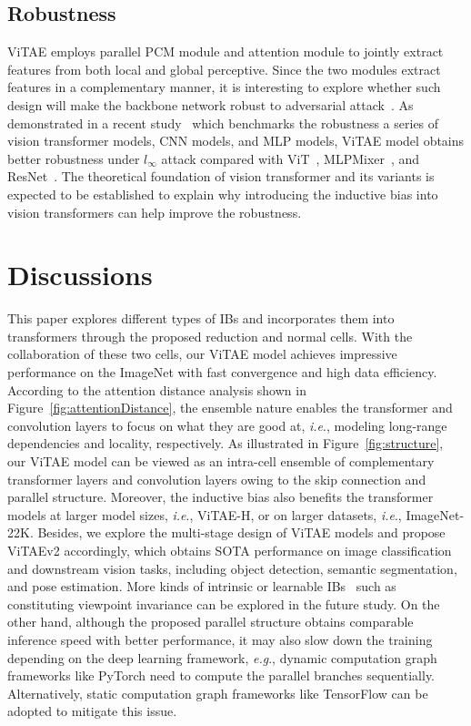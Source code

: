 \documentclass[twocolumn]{svjour3}          \smartqed  \usepackage{natbib}
\newcommand{\ie}{i.e}
\newcommand{\eg}{e.g}
\def\onedot{.\xspace}
\def\eg{\emph{e.g}\onedot}
\def\ie{\emph{i.e}\onedot}
\begin{document}
\subsection{Robustness} 
ViTAE employs parallel PCM module and attention module to jointly extract features from both local and global perceptive. Since the two modules extract features in a complementary manner, it is interesting to explore whether such design will make the backbone network robust to adversarial attack~\citep{bhojanapalli2021understanding}. As demonstrated in a recent study~\citep{tang2021robustart} which benchmarks the robustness a series of vision transformer models, CNN models, and MLP models, ViTAE model obtains better robustness under $l_{\infty}$ attack compared with ViT~\citep{dosovitskiy2020image}, MLPMixer~\citep{tolstikhin2021mlp}, and ResNet~\citep{he2016deep}. The theoretical foundation of vision transformer and its variants is expected to be established to explain why introducing the inductive bias into vision transformers can help improve the robustness. 
\section{Discussions}
\label{sec:ViTAElimit}
This paper explores different types of IBs and incorporates them into transformers through the proposed reduction and normal cells. With the collaboration of these two cells, our ViTAE model achieves impressive performance on the ImageNet with fast convergence and high data efficiency. According to the attention distance analysis shown in Figure~\ref{fig:attentionDistance}, the ensemble nature enables the transformer and convolution layers to focus on what they are good at, \ie, modeling long-range dependencies and locality, respectively. As illustrated in Figure~\ref{fig:structure}, our ViTAE model can be viewed as an intra-cell ensemble of complementary transformer layers and convolution layers owing to the skip connection and parallel structure. Moreover, the inductive bias also benefits the transformer models at larger model sizes, \ie, ViTAE-H, or on larger datasets, \ie, ImageNet-22K. Besides, we explore the multi-stage design of ViTAE models and propose ViTAEv2 accordingly, which obtains SOTA performance on image classification and downstream vision tasks, including object detection, semantic segmentation, and pose estimation. More kinds of intrinsic or learnable IBs~\citep{sabour2017dynamic,zhang2022vsa} such as constituting viewpoint invariance can be explored in the future study. On the other hand, although the proposed parallel structure obtains comparable inference speed with better performance, it may also slow down the training depending on the deep learning framework, \eg, dynamic computation graph frameworks like PyTorch need to compute the parallel branches sequentially. Alternatively, static computation graph frameworks like TensorFlow can be adopted to mitigate this issue.
\end{document}
